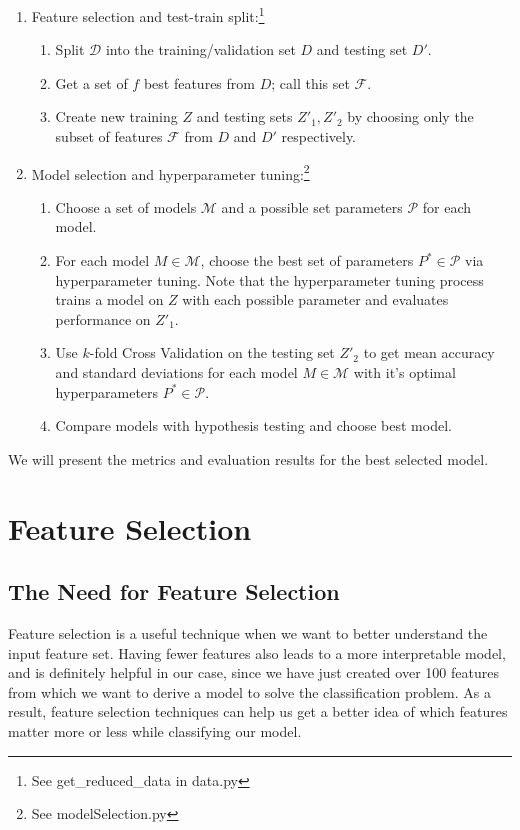 \documentclass[fleqn]{article}
\begin{document}
    \begin{enumerate}
        \item Feature selection and test-train split:\footnote{See get\_reduced\_data in data.py}
        \begin{enumerate}[label=\roman*.]
            \item Split $ \mathcal{D} $ into the training/validation set $ D $ and testing
            set $ D' $.
            \item Get a set of $ f $ best features from $ D $; call this set $ \mathcal{F} $.
            \item Create new training $ Z $ and testing sets $ Z'_1, Z'_2 $ by
            choosing only the subset of features $ \mathcal{F} $ from $ D $ and $D'$ respectively.
        \end{enumerate}
        \item Model selection and hyperparameter tuning:\footnote{See modelSelection.py}
        \begin{enumerate}[label=\roman*.]
            \item Choose a set of models $ \mathcal{M} $ and a possible set parameters
            $ \mathcal{P} $ for each model.
            \item For each model $ M \in \mathcal{M} $, choose the best set of parameters
            $ P^* \in\mathcal{P} $ via hyperparameter tuning. Note that the hyperparameter
            tuning process trains a model on $ Z $ with each possible parameter and evaluates
            performance on $ Z'_1 $.
            \item Use $k$-fold Cross Validation on the testing set $ Z'_2 $ to get mean accuracy
            and standard deviations for each model $ M \in \mathcal{M} $ with it's
            optimal hyperparameters $ P^* \in\mathcal{P} $.
            \item Compare models with hypothesis testing and choose best model.
        \end{enumerate}
    \end{enumerate}

    We will present the metrics and evaluation results for the best selected model.

    \section{Feature Selection}

    \subsection{The Need for Feature Selection}
    Feature selection is a useful technique when we want to better understand the input
    feature set. Having fewer features also leads to a more interpretable model, and is
    definitely helpful in our case, since we have just created over 100 features from
    which we want to derive a model to solve the classification problem. As a result,
    feature selection techniques can help us get a better idea of which features matter
    more or less while classifying our model.\\
\end{document}
